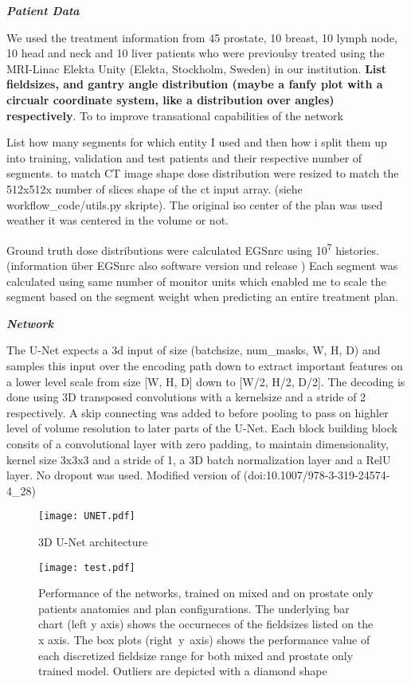 \textbf{\emph{Patient Data}}

We used the treatment information from 45 prostate, 10 breast, 10 lymph node, 10 head and neck and 10 liver patients who were previoulsy treated using the MRI-Linac Elekta Unity (Elekta, Stockholm, Sweden) in our institution. \textbf{List fieldsizes, and gantry angle distribution (maybe a fanfy plot with a circualr coordinate system, like a distribution over angles) respectively}. 
To to improve transational capabilities of the network 

List how many segments for which entity I used and then how i split them up into training, validation and test patients and their respective number of segments. to match CT image shape dose distribution were resized to match the 512x512x number of slices shape of the ct input array. (siehe workflow\_code/utils.py skripte). The original iso center of the plan was used weather it was centered in the volume or not. 

Ground truth dose distributions were calculated EGSnrc using 10\textsuperscript{7} histories. (information über EGSnrc also software version und release \cite{noauthor_nrc-cnrcegsnrc_2021}) Each segment was calculated using same number of monitor units which enabled me to scale the segment based on the segment weight when predicting an entire treatment plan. 

\textbf{\emph{Network}}

The U-Net expects a 3d input of size (batchsize, num\_masks, W, H, D) and samples this input over the encoding path down to extract important features on a lower level scale from size [W, H, D] down to [W/2, H/2, D/2]. The decoding is done using 3D transposed convolutions with a kernelsize and a stride of 2 respectively. A skip connecting was added to before pooling to pass on highler level of volume resolution to later parts of the U-Net. 
Each block building block consits of a convolutional layer with zero padding, to maintain dimensionality, kernel size 3x3x3 and a stride of 1, a 3D batch normalization layer and a RelU layer. No dropout was used. 
Modified version of (doi:10.1007/978-3-319-24574-4\_28)


\begin{figure}
	\centering
    \texttt{[image: UNET.pdf]}
    \caption{3D U-Net architecture}
    \label{fig: unet}
\end{figure}

\begin{figure}
	\centering
    \texttt{[image: test.pdf]}
    \caption{Performance of the networks, trained on mixed and on prostate only patients anatomies and plan configurations. The underlying bar chart (left y axis) shows the occurneces of the fieldsizes listed on the x axis. The box plots (right y axis) shows the performance value of each discretized fieldsize range for both mixed and prostate only trained model. Outliers are depicted with a diamond shape}
    \label{fig: test}
\end{figure}

